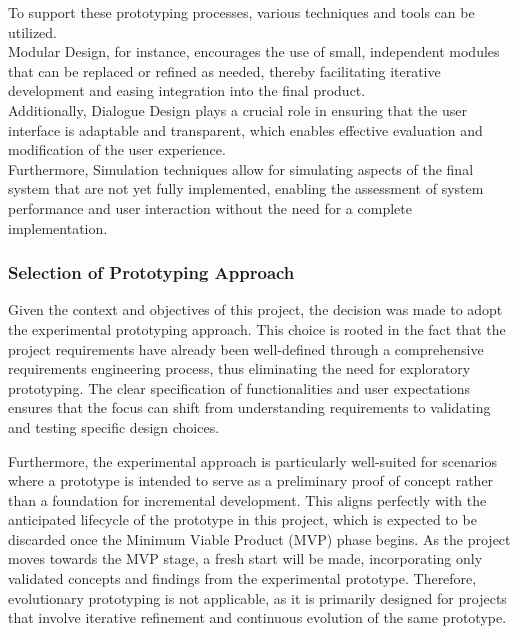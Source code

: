 To support these prototyping processes, various techniques and tools can be utilized.
\autocite[cf.][p.12]{floydSystematicLookPrototyping1984} \\Modular Design, for instance, encourages the use of small,
independent modules that can be replaced or refined as needed, thereby facilitating iterative development and easing
integration into the final product.\autocite[cf.][p.12]{floydSystematicLookPrototyping1984} \\Additionally, Dialogue
Design plays a crucial role in ensuring that the user interface is adaptable and transparent, which enables effective
evaluation and modification of the user experience.\autocite[cf.][p.12]{floydSystematicLookPrototyping1984}
\\Furthermore, Simulation techniques allow for simulating aspects of the final system that are not yet fully
implemented, enabling the assessment of system performance and user interaction without the need for a complete
implementation.\autocite[cf.][p.13]{floydSystematicLookPrototyping1984}

\subsubsection{Selection of Prototyping Approach}\label{subsubsec:ptselection}

Given the context and objectives of this project, the decision was made to adopt the experimental prototyping approach.
This choice is rooted in the fact that the project requirements have already been well-defined through a comprehensive
requirements engineering process, thus eliminating the need for exploratory prototyping. The clear specification of
functionalities and user expectations ensures that the focus can shift from understanding requirements to validating and
testing specific design choices.

Furthermore, the experimental approach is particularly well-suited for scenarios where a prototype is intended to serve
as a preliminary proof of concept rather than a foundation for incremental development. This aligns perfectly with the
anticipated lifecycle of the prototype in this project, which is expected to be discarded once the Minimum Viable
Product (\ac{MVP}) phase begins. As the project moves towards the MVP stage, a fresh start will be made, incorporating
only validated concepts and findings from the experimental prototype. Therefore, evolutionary prototyping is not
applicable, as it is primarily designed for projects that involve iterative refinement and continuous evolution of the
same prototype.

